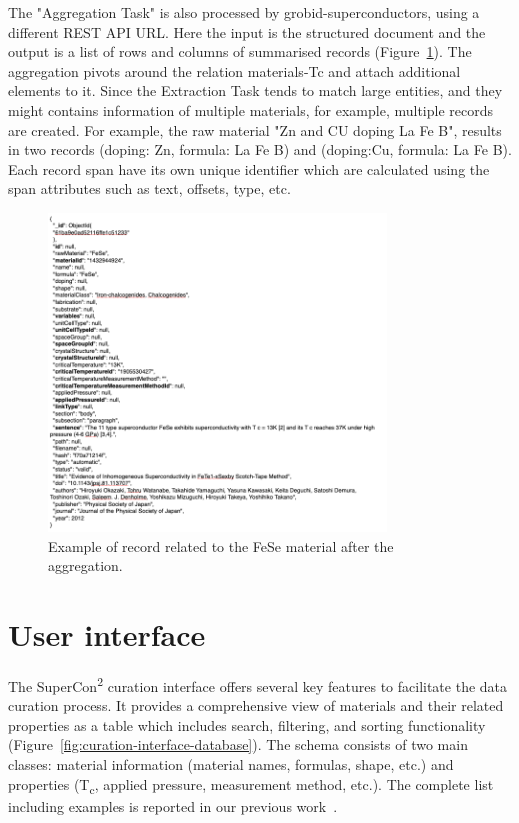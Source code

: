 \documentclass[a4paper]{article}
\begin{document}
The "Aggregation Task" is also processed by grobid-superconductors, using a different REST API URL. Here the input is the structured document and the output is a list of rows and columns of summarised records (Figure~\ref{fig:data-flow-3}). 
The aggregation pivots around the relation materials-Tc and attach additional elements to it. Since the Extraction Task tends to match large entities, and they might contains information of multiple materials, for example, multiple records are created. For example, the raw material "Zn and CU doping La Fe B", results in two records (doping: Zn, formula: La Fe B) and (doping:Cu, formula: La Fe B). 
Each record span have its own unique identifier which are calculated using the span attributes such as text, offsets, type, etc. 

\begin{figure}
  \centering
  \includegraphics[width=0.8\textwidth]{images/data-flow-3} 
  \caption{Example of record related to the FeSe material after the aggregation.}
  \label{fig:data-flow-3}
\end{figure}

\section{User interface}
\label{sec:user-interface}

The SuperCon\textsuperscript{2} curation interface offers several key features to facilitate the data curation process.
It provides a comprehensive view of materials and their related properties as a table which includes search, filtering, and sorting functionality (Figure~\ref{fig:curation-interface-database}). 
The schema consists of two main classes: material information (material names, formulas, shape, etc.) and properties (T\textsubscript{c}, applied pressure, measurement method, etc.). The complete list including examples is reported in our previous work~\cite{lfoppiano2023automatic}.
\end{document}
